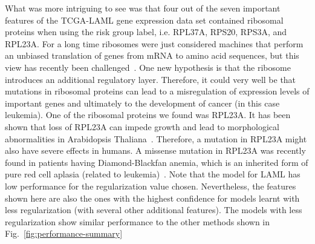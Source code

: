 What was more intriguing to see was that four out of the seven important features of the TCGA-LAML gene expression data set contained ribosomal proteins when using the risk group label, i.e. RPL37A, RPS20, RPS3A, and RPL23A. For a long time ribosomes were just considered machines that perform an unbiased translation of genes from mRNA to amino acid sequences, but this view has recently been challenged~\cite{Xue2012}. One new hypothesis is that the ribosome introduces an additional regulatory layer. Therefore, it could very well be that mutations in ribosomal proteins can lead to a misregulation of expression levels of important genes and ultimately to the development of cancer (in this case leukemia). One of the ribosomal proteins we found was RPL23A. It has been shown that loss of RPL23A can impede growth and lead to morphological abnormalities in Arabidopsis Thaliana~\cite{Xue2012}. Therefore, a mutation in RPL23A might also have severe effects in humans. A missense mutation in RPL23A was recently found in patients having Diamond-Blackfan anemia, which is an inherited form of pure red cell aplasia (related to leukemia)~\cite{Gazda2012}. Note that the model for LAML has low performance for the regularization value chosen. Nevertheless, the features shown here are also the ones with the highest confidence for models learnt with less regularization (with several other additional features). The models with less regularization show similar performance to the other methods shown in Fig.~\ref{fig:performance-summary}

